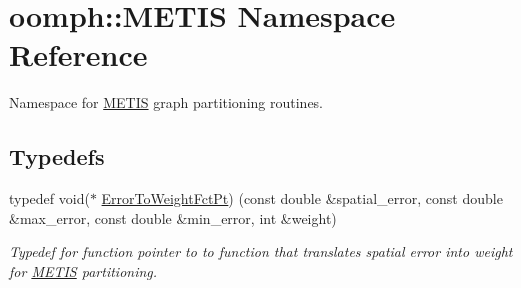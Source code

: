 \hypertarget{namespaceoomph_1_1METIS}{}\section{oomph\+:\+:M\+E\+T\+IS Namespace Reference}
\label{namespaceoomph_1_1METIS}


Namespace for \hyperlink{namespaceoomph_1_1METIS}{M\+E\+T\+IS} graph partitioning routines.  


\subsection*{Typedefs}
\begin{DoxyCompactItemize}
\item 
typedef void($\ast$ \hyperlink{namespaceoomph_1_1METIS_aec228e35df8426d16639b961fcf98df1}{Error\+To\+Weight\+Fct\+Pt}) (const double \&spatial\+\_\+error, const double \&max\+\_\+error, const double \&min\+\_\+error, int \&weight)
\begin{DoxyCompactList}\small\item\em Typedef for function pointer to to function that translates spatial error into weight for \hyperlink{namespaceoomph_1_1METIS}{M\+E\+T\+IS} partitioning. \end{DoxyCompactList}\end{DoxyCompactItemize}
